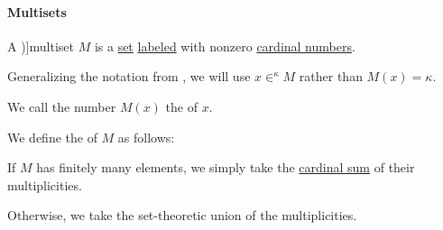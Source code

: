 \paragraph{Multisets}

\begin{definition}\label{def:multiset}
  A \term[ru=мультимножество (\incite[28]{Новиков2013})]{multiset} \( M \) is a \hyperref[def:set]{set} \hyperref[def:labeled_set]{labeled} with nonzero \hyperref[def:cardinal]{cardinal numbers}.

  Generalizing the notation from , we will use \( x \in^\kappa M \) rather than \( M(x) = \kappa \).

  \begin{thmenum}
     We call the number \( M(x) \) the  of \( x \).

    \mimprovised We define the  of \( M \) as follows:
    \begin{thmenum}
       If \( M \) has finitely many elements, we simply take the \hyperref[def:cardinal_arithmetic/addition]{cardinal sum} of their multiplicities.

       Otherwise, we take the set-theoretic union of the multiplicities.
    \end{thmenum}
  \end{thmenum}
\end{definition}
